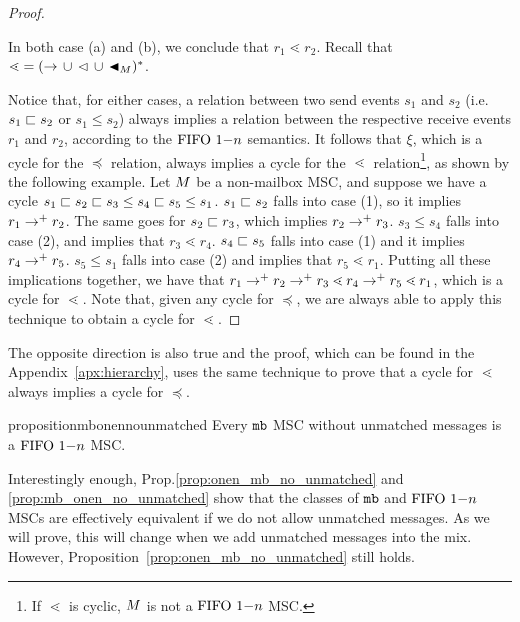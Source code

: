 \begin{proof}
\begin{enumerate}
\begin{enumerate}
	\end{enumerate}
	In both case (a) and (b), we conclude that $r_1 \lessdot r_2$. Recall that ${\lessdot} = ({\to} \,\cup\, {\lhd} \,\cup\, {\blacktriangleleft_M})^\ast$.
\end{enumerate}
Notice that, for either cases, a relation between two send events $s_1$ and $s_2$ (i.e. $s_1 \sqsubset s_2$ or $s_1 \le s_2$) always implies a relation between the respective receive events $r_1$ and $r_2$, according to the $\text{FIFO } 1\mathsf{-}n$ semantics. It follows that $\xi$, which is a cycle for the $\preceq$ relation, always implies a cycle for the $\lessdot$ relation\footnote{If $\lessdot$ is cyclic, $M$ is not a $\text{FIFO } 1\mathsf{-}n$ MSC.}, as shown by the following example. Let $M$ be a non-mailbox MSC, and suppose we have a cycle $s_1 \sqsubset s_2 \sqsubset s_3 \le s_4 \sqsubset s_5 \le s_1$. $s_1 \sqsubset s_2$ falls into case (1), so it implies $r_1 \to^+ r_2$. The same goes for $s_2 \sqsubset r_3$, which implies $r_2 \to^+ r_3$. $s_3 \le s_4$ falls into case (2), and implies that $r_3 \lessdot r_4$. $s_4 \sqsubset s_5$ falls into case (1) and it implies $r_4 \to^+ r_5$. $s_5 \le s_1$ falls into case (2) and implies that $r_5 \lessdot r_1$. Putting all these implications together, we have that $r_1 \to^+ r_2 \to^+ r_3 \lessdot r_4 \to^+ r_5 \lessdot r_1$, which is a cycle for $\lessdot$. Note that, given any cycle for $\preceq$, we are always able to apply this technique to obtain a cycle for $\lessdot$.
\end{proof}

The opposite direction is also true and the proof, which can be found in the Appendix~\ref{apx:hierarchy}, uses the same technique to prove that a cycle for $\lessdot$ always implies a cycle for $\preceq$.

\begin{restatable}{proposition}{mbonennounmatched} 
\label{prop:mb_onen_no_unmatched}
	Every $\mathtt{mb}$ MSC without unmatched messages is a $\text{FIFO } 1\mathsf{-}n$ MSC.
\end{restatable}

Interestingly enough, Prop.\ref{prop:onen_mb_no_unmatched} and \ref{prop:mb_onen_no_unmatched} show that the classes of $\mathtt{mb}$ and $\text{FIFO } 1\mathsf{-}n$ MSCs are effectively equivalent if we do not allow unmatched messages. As we will prove, this will change when we add unmatched messages into the mix. However, Proposition~\ref{prop:onen_mb_no_unmatched} still holds.

